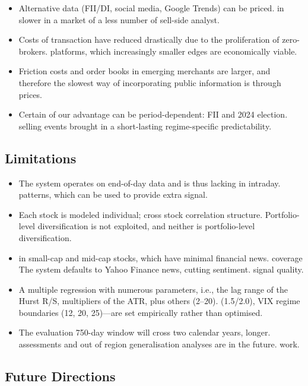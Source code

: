 \documentclass[10pt,a4paper,twoside]{article}
\begin{document}
\begin{itemize}
\item Alternative data (FII/DI, social media, Google Trends) can be priced.
  in slower in a market of a less number of sell-side analyst.
\item Costs of transaction have reduced drastically due to the proliferation of zero-brokers.
  platforms, which increasingly smaller edges are economically viable.
\item Friction costs and order books in emerging merchants are larger, and therefore
  the slowest way of incorporating public information is through prices.
\item Certain of our advantage can be period-dependent: FII and 2024 election.
  selling events brought in a short-lasting regime-specific predictability.
\end{itemize}

\subsection{Limitations}

\begin{itemize}
\item The system operates on end-of-day data and is thus lacking in intraday.
  patterns, which can be used to provide extra signal.
\item Each stock is modeled individual; cross stock correlation structure.
  Portfolio-level diversification is not exploited, and neither is portfolio-level diversification.
\item in small-cap and mid-cap stocks, which have minimal financial news.
  coverage The system defaults to Yahoo Finance news, cutting sentiment.
  signal quality.
\item A multiple regression with numerous parameters, i.e., the lag range of the Hurst R/S, multipliers of the ATR, plus others (2--20).
  (1.5/2.0), VIX regime boundaries (12, 20, 25)---are set empirically rather
  than optimised.
\item The evaluation 750-day window will cross two calendar years, longer.
  assessments and out of region generalisation analyses are in the future.
  work.
\end{itemize}

\subsection{Future Directions}
\end{document}
